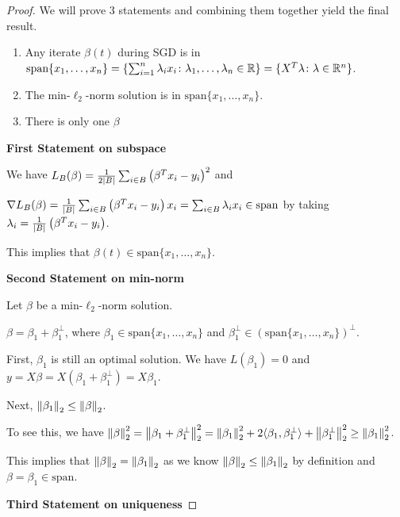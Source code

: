 \begin{proof}
    We will prove 3 statements and combining them together yield the final result. 
    \begin{enumerate}[label=\textcircled{\small\arabic*}]
        \item Any iterate \(\beta(t)\) during SGD is in 
        \(\text{span}\{x_1, \ldots, x_n\} = \{\sum_{i=1}^n \lambda_i x_i \colon \lambda_1, \ldots, \lambda_n \in \mathbb{R}\}
        = \{ X^T \lambda \colon \lambda \in \mathbb{R}^n \}\). 
        \item The min-\(\ell_2\)-norm solution is in \(\text{span}\{x_1, \ldots, x_n\}\). 
        \item There is only one \(\beta\)
    \end{enumerate}


    \textbf{First Statement on subspace}

    We have \(L_B(\beta) = \frac{1}{2\lvert B \rvert} \sum_{i \in B} \left(\beta^T x_i  - y_i\right)^2\) and 

    \(\nabla L_B(\beta) = \frac{1}{\lvert B \rvert} \sum_{i \in B} \left(\beta^T x_i - y_i\right)x_i 
    = \sum_{i \in B} \lambda_i x_i \in \text{span}\) by taking \(\lambda_i = \frac{1}{\lvert B \rvert}
    \left(\beta^T x_i - y_i\right)\). 

    This implies that \(\beta(t) \in \text{span}\{ x_1, \ldots, x_n \}\). 

    \textbf{Second Statement on min-norm}

    Let \(\beta\) be a min-\(\ell_2\)-norm solution. 

    \(\beta = \beta_1 + \beta_1^\perp\), where \(\beta_1 \in \text{span}\{x_1,\ldots, x_n\}\) and 
    \(\beta_1^\perp \in \left(\text{span}\{x_1, \ldots, x_n\}\right)^\perp\). 

    First, \(\beta_1\) is still an optimal solution. We have \(L(\beta_1) = 0\) and 
    \(y = X\beta = X(\beta_1 + \beta_1^\perp) = X\beta_1\). 

    Next, \(\norm{\beta_1}_2 \leq \norm{\beta}_2\). 
    
    To see this, we have \(\norm{\beta}_2^2 = \norm{\beta_1 + \beta_1^\perp}_2^2 = \norm{\beta_1}_2^2 
    + 2 \langle \beta_1, \beta_1^\perp \rangle + \norm{\beta_1^\perp}_2^2 \geq \norm{\beta_1}^2_2\). 

    This implies that \(\norm{\beta}_2 = \norm{\beta_1}_2\) as we know \(\norm{\beta}_2 \leq \norm{\beta_1}_2\)
    by definition and \(\beta = \beta_1 \in \text{span}\). 

 
    \textbf{Third Statement on uniqueness} 


\end{proof}

